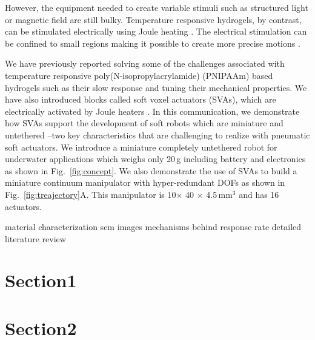 However, the equipment needed to create variable stimuli such as structured light \cite{palagi2016structured} or magnetic field \cite{Kim2018} are still bulky.  
Temperature responsive hydrogels, by contrast, can be stimulated electrically using Joule heating \cite{yu2013electronically}. The electrical stimulation can be confined to small regions making it possible to create more precise motions \cite{richter2009optoelectrothermic}. 

We have previously reported solving some of the challenges associated with temperature responsive poly(N-isopropylacrylamide) (PNIPAAm) based hydrogels such as their slow response and tuning their mechanical properties. We have also introduced blocks called soft voxel actuators (SVAs), which are electrically activated by Joule heaters \cite{khodambashi2021heterogeneous}. 
In this communication, we demonstrate how SVAs support the development of soft robots which are miniature and untethered --two key characteristics that are challenging to realize with pneumatic soft actuators. We introduce a miniature completely untethered robot for underwater applications which weighs only 20\,g including battery and electronics as shown in Fig.~\ref{fig:concept}. We also demonstrate the use of SVAs to build a miniature continuum manipulator with hyper-redundant DOFs as shown in Fig.~\ref{fig:treajectory}A. This manipulator is 10$\times$ 40 $\times$ 4.5\,mm$^3$ and has 16 actuators. 

material characterization
sem images
mechanisms behind response rate
detailed literature review
\section{Section1}
\section{Section2}